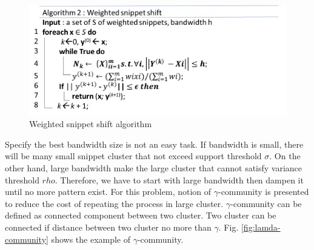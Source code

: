 \documentclass[conference]{IEEEtran}
\begin{document}
\begin{figure}[h!]
	\centering
	\includegraphics[width=1.0\linewidth]{"algorithm weighted snippet"}
	\caption{Weighted snippet shift algorithm \cite{zhang2014splitter}}
	\label{fig:algorithm-weighted-snippet}
\end{figure}
Specify the best bandwidth size is not an easy task. If bandwidth is small, there will be many small snippet cluster that not exceed support threshold $\sigma$. On the other hand, large bandwidth make the large cluster that cannot satisfy variance threshold $rho$. Therefore, we have to start with large bandwidth then dampen it until no more pattern exist. For this problem, notion of $\gamma$-community is presented to reduce the cost of repeating the process in large cluster. $\gamma$-community can be defined as connected component between two cluster. Two cluster can be connected if distance between two cluster no more than $\gamma$.  Fig. \ref{fig:lamda-community} shows the example of $\gamma$-community. 
\end{document}
